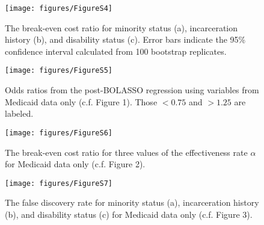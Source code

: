 \documentclass[9pt,twoside]{pnas-new}
\begin{document}
\begin{figure}
\caption{The break-even cost ratio for minority status (a), incarceration history (b), and disability status (c). Error bars indicate the 95\% confidence interval calculated from 100 bootstrap replicates.}
\centering
\texttt{[image: figures/FigureS4]}
\end{figure}

\begin{figure}
\caption{Odds ratios from the post-BOLASSO regression using variables from Medicaid data only (c.f. Figure 1). Those $<0.75$ and $>1.25$ are labeled.}
\centering
\texttt{[image: figures/FigureS5]}
\end{figure}

\begin{figure}
\caption{The break-even cost ratio for three values of the effectiveness rate $\alpha$ for Medicaid data only (c.f. Figure 2).}
\centering
\texttt{[image: figures/FigureS6]}
\end{figure}

\begin{figure}
\caption{The false discovery rate for minority status (a), incarceration history (b), and disability status (c) for Medicaid data only (c.f. Figure 3).}
\centering
\texttt{[image: figures/FigureS7]}
\end{figure}
\end{document}
